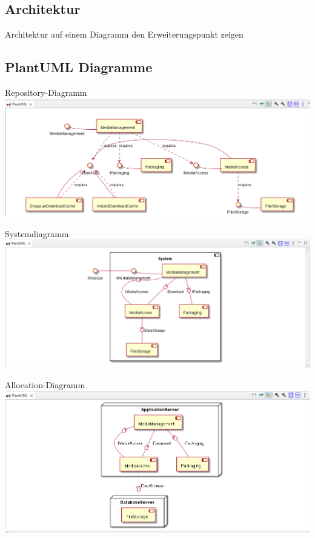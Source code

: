 \documentclass{sdqbeamer}
\begin{document}
\subsection{Architektur}
\begin{frame}{Architektur}
auf einem Diagramm den Erweiterungspunkt zeigen
\end{frame}

\subsection{PlantUML Diagramme}
\begin{frame}{Repository-Diagramm}
\includegraphics[width=\textwidth]{repository.png}
\end{frame}
\begin{frame}{Systemdiagramm}
\includegraphics[width=\textwidth]{system.png}
\end{frame}
\begin{frame}{Allocation-Diagramm}
\includegraphics[width=\textwidth, height=.8\textheight]{allocation.png}
\end{frame}
\end{document}
